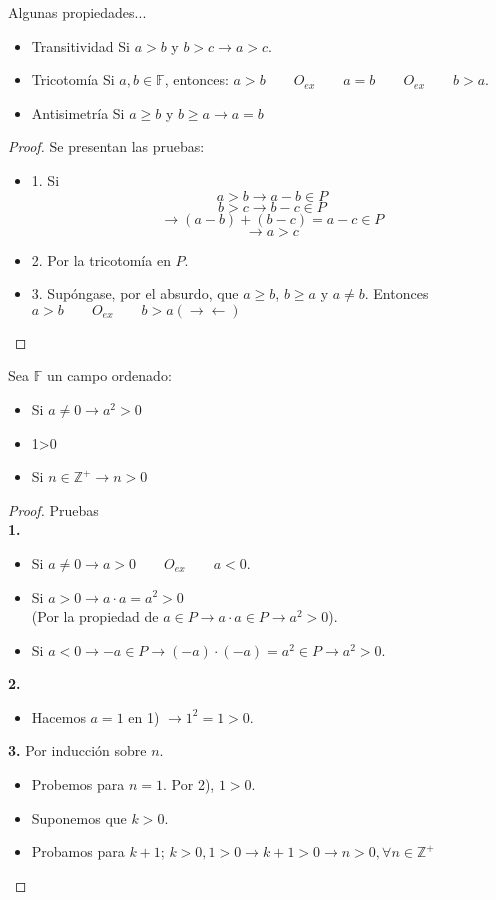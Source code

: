 \begin{proposition}
Algunas propiedades...
\begin{itemize}
    \item{Transitividad} Si $a>b$ y $b>c\to a>c$.
    \item{Tricotomía} Si $a,b\in \mathbb{F}$, entonces: \newline $a>b\quad\quad O_{ex}\quad\quad a=b \quad \quad O_{ex}\quad \quad b>a$.
    \item{Antisimetría} Si $a\geq b$ y $b\geq a \to a=b$
\end{itemize}
\end{proposition}
\begin{proof}
Se presentan las pruebas: 
\begin{itemize}
    \item {1.} Si $$a>b\to a-b\in P$$
                  $$b>c\to b-c \in P$$
                  $$\to (a-b)+(b-c)= a-c \in P$$
                  $$\to a>c$$
    \item {2.} Por la tricotomía en $P$.
    \item {3.} Supóngase, por el absurdo, que $a\geq b$, $b\geq a$ y $a\neq b$. Entonces $a>b\quad \quad O_{ex} \quad \quad b>a (\to\gets)$
\end{itemize}
\end{proof}
\begin{proposition}
Sea $\mathbb{F}$ un campo ordenado: 
\begin{itemize}
    \item Si $a\neq 0\to a^2>0$
    \item 1>0
    \item Si $n\in \mathbb{Z}^+\to n>0$
\end{itemize}
\end{proposition}

\begin{proof}
Pruebas\\
\textbf{1.}
\begin{itemize}
\item Si $a\neq 0 \to a>0\quad\quad O_{ex}\quad \quad a<0$.
\item Si $a>0\to a\cdot a= a^2 >0$\\ (Por la propiedad de $a\in P \to a\cdot a \in P \to a^2>0$).
\item Si $a<0 \to -a\in P\to (-a)\cdot (-a) = a^2\in P\to a^2>0$.
\end{itemize}
\textbf{2.}
\begin{itemize}
    \item Hacemos $a=1$ en 1) $\to 1^2=1>0$. 
\end{itemize}
\textbf{3.} Por inducción sobre $n$.
\begin{itemize}
    \item Probemos para $n=1$. Por 2), $1>0$.
    \item Suponemos que $k>0$.
    \item Probamos para $k+1$; $k>0,1>0 \to k+1>0\to n>0, \forall n\in \mathbb{Z}^+$
\end{itemize}
\end{proof}

